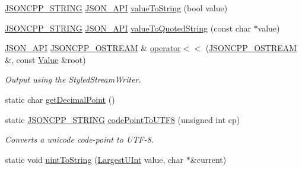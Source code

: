 \begin{DoxyCompactItemize}
\item 
\hyperlink{json_8h_a1e723f95759de062585bc4a8fd3fa4be_a1e723f95759de062585bc4a8fd3fa4be}{J\+S\+O\+N\+C\+P\+P\+\_\+\+S\+T\+R\+I\+NG} \hyperlink{json_8h_a1d61ffde86ce1a18fd83194ff0d9a206_a1d61ffde86ce1a18fd83194ff0d9a206}{J\+S\+O\+N\+\_\+\+A\+PI} \hyperlink{namespaceJson_a0a706a1fffba4fe8a8c1ef75b2dbbfab_a0a706a1fffba4fe8a8c1ef75b2dbbfab}{value\+To\+String} (bool value)
\item 
\hyperlink{json_8h_a1e723f95759de062585bc4a8fd3fa4be_a1e723f95759de062585bc4a8fd3fa4be}{J\+S\+O\+N\+C\+P\+P\+\_\+\+S\+T\+R\+I\+NG} \hyperlink{json_8h_a1d61ffde86ce1a18fd83194ff0d9a206_a1d61ffde86ce1a18fd83194ff0d9a206}{J\+S\+O\+N\+\_\+\+A\+PI} \hyperlink{namespaceJson_aaf777a6923bcb4cf63a2729973fe5315_aaf777a6923bcb4cf63a2729973fe5315}{value\+To\+Quoted\+String} (const char $\ast$value)
\item 
\hyperlink{json_8h_a1d61ffde86ce1a18fd83194ff0d9a206_a1d61ffde86ce1a18fd83194ff0d9a206}{J\+S\+O\+N\+\_\+\+A\+PI} \hyperlink{json_8h_a37a25be5fca174927780caeb280094ce_a37a25be5fca174927780caeb280094ce}{J\+S\+O\+N\+C\+P\+P\+\_\+\+O\+S\+T\+R\+E\+AM} \& \hyperlink{namespaceJson_a975d1dbca8aa7a06f38d373edcb9081c_a975d1dbca8aa7a06f38d373edcb9081c}{operator$<$$<$} (\hyperlink{json_8h_a37a25be5fca174927780caeb280094ce_a37a25be5fca174927780caeb280094ce}{J\+S\+O\+N\+C\+P\+P\+\_\+\+O\+S\+T\+R\+E\+AM} \&, const \hyperlink{classJson_1_1Value}{Value} \&root)
\begin{DoxyCompactList}\small\item\em Output using the Styled\+Stream\+Writer. \end{DoxyCompactList}\item 
static char \hyperlink{namespaceJson_ac99d7a5551039dfa712dd1d143c25a16_ac99d7a5551039dfa712dd1d143c25a16}{get\+Decimal\+Point} ()
\item 
static \hyperlink{json_8h_a1e723f95759de062585bc4a8fd3fa4be_a1e723f95759de062585bc4a8fd3fa4be}{J\+S\+O\+N\+C\+P\+P\+\_\+\+S\+T\+R\+I\+NG} \hyperlink{namespaceJson_a33f8bda65a5b1fc4f5ddc39cb03dc742_a33f8bda65a5b1fc4f5ddc39cb03dc742}{code\+Point\+To\+U\+T\+F8} (unsigned int cp)
\begin{DoxyCompactList}\small\item\em Converts a unicode code-\/point to U\+T\+F-\/8. \end{DoxyCompactList}\item 
static void \hyperlink{namespaceJson_ac1ffd21a9e55122014353c773ccc496e_ac1ffd21a9e55122014353c773ccc496e}{uint\+To\+String} (\hyperlink{namespaceJson_ae202ecad69725e23443f465e257456d0_ae202ecad69725e23443f465e257456d0}{Largest\+U\+Int} value, char $\ast$\&current)

\end{DoxyCompactItemize}
